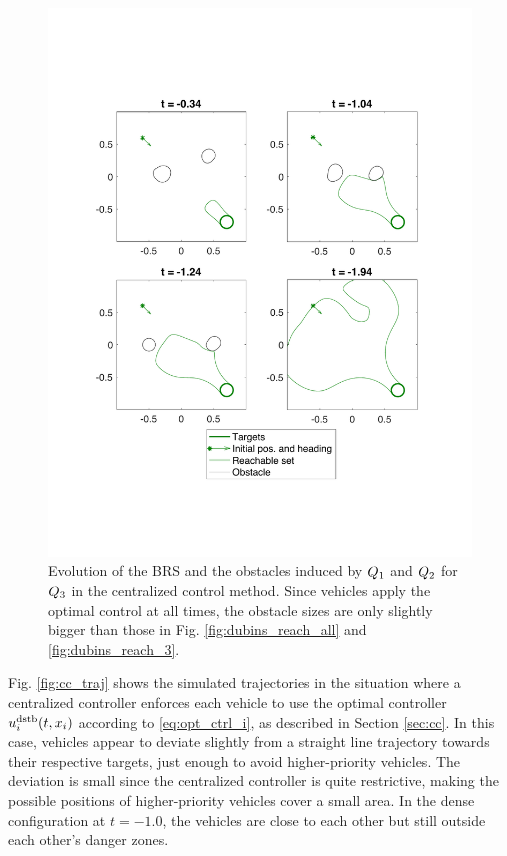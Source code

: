 \begin{figure}[H]
  \centering
  \includegraphics[width=\columnwidth]{"fig/cc_rs3"}
  \caption{Evolution of the BRS and the obstacles induced by $Q_1$ and $Q_2$ for $Q_3$ in the centralized control method. Since vehicles apply the optimal control at all times, the obstacle sizes are only slightly bigger than those in Fig. \ref{fig:dubins_reach_all} and \ref{fig:dubins_reach_3}.}
  \label{fig:cc_rs3}
\end{figure}

Fig. \ref{fig:cc_traj} shows the simulated trajectories in the situation where a centralized controller enforces each vehicle to use the optimal controller $u^\text{dstb}_i(t, x_i)$ according to \eqref{eq:opt_ctrl_i}, as described in Section \ref{sec:cc}. In this case, vehicles appear to deviate slightly from a straight line trajectory towards their respective targets, just enough to avoid higher-priority vehicles. The deviation is small since the centralized controller is quite restrictive, making the possible positions of higher-priority vehicles cover a small area. In the dense configuration at $t=-1.0$, the vehicles are close to each other but still outside each other's danger zones.

